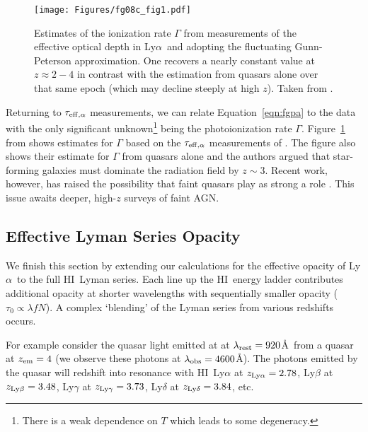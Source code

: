 \documentclass[graybox]{svmult}
\newcommand{\HI}{H{\sc I}}
\def\lya{Ly$\alpha$}
\begin{document}
%
\begin{figure}[ht]
\sidecaption
\texttt{[image: Figures/fg08c\_fig1.pdf]}
%
%
\caption{
Estimates of the ionization rate $\Gamma$ from measurements
of the effective optical depth in \lya\ and adopting the
fluctuating Gunn-Peterson approximation.  One recovers a 
nearly constant value at $z \approx 2-4$ in contrast with the
estimation from quasars alone over that same epoch (which
may decline steeply at high $z$).
Taken from \cite{flh+08b}.
}
\label{fig:Gamma}       %
\end{figure}


Returning to $\tau_{\rm eff,\alpha}$ measurements,
we can relate Equation~\ref{eqn:fgpa} to the data
with the only significant unknown\footnote{There is a
weak dependence on $T$ which leads to some degeneracy.} 
being the photoionization rate $\Gamma$.
Figure~\ref{fig:Gamma} from \cite{flh+08b}
shows estimates for $\Gamma$
based on the $\tau_{\rm eff,\alpha}$ measurements of 
\cite{fpl+08}.  The figure also shows their  
estimate for $\Gamma$ from quasars alone and the
authors argued that star-forming galaxies
must dominate the radiation field by $z \sim 3$.
Recent work, however, has raised the possibility
that faint quasars play as strong a role
\cite[]{giallongo+15,madau15}. This issue awaits
deeper, high-$z$ surveys of faint AGN.

\subsection{Effective Lyman Series Opacity}
We finish this section by extending our calculations
for the effective opacity of \lya\ to the full
\HI\ Lyman series.  Each line up the \HI\ energy ladder 
contributes additional opacity at shorter
wavelengths with sequentially smaller opacity
($\tau_0 \propto \lambda f N$).
A complex `blending' of the Lyman series
from various redshifts occurs.  

For example
consider the quasar light emitted at 
at $\lambda_{\rm rest} = 920$\AA\ 
from a quasar at $z_{\rm em} = 4$
(we observe these photons at $\lambda_{\rm obs} = 4600$\AA).
The photons emitted by the quasar will redshift into
resonance with 
\HI\ Ly$\alpha$ at $z_{\rm Ly\alpha} = 2.78$,
Ly$\beta$ at $z_{\rm Ly\beta} = 3.48$,
Ly$\gamma$ at $z_{\rm Ly\gamma} = 3.73$,
Ly$\delta$ at $z_{\rm Ly\delta} = 3.84$, etc.
\end{document}
